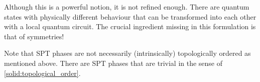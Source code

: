     Although this is a powerful notion, it is not refined enough. There are quantum states with physically different behaviour that can be transformed into each other with a local quantum circuit. The crucial ingredient missing in this formulation is that of symmetries!
    
    \begin{remark}
        Note that SPT phases are not necessarily (intrinsically) topologically ordered as mentioned above. There are SPT phases that are trivial in the sense of \cref{solid:topological_order}.
    \end{remark}